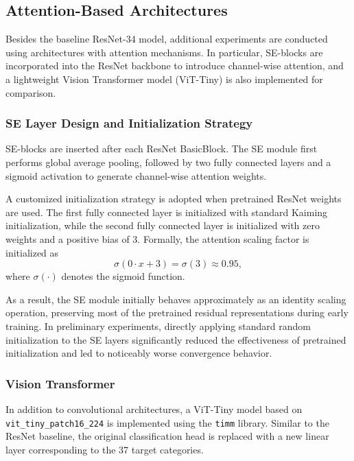 \subsection{Attention-Based Architectures}
\label{sec:attention_architectures}

Besides the baseline ResNet-34 model, additional experiments are conducted using architectures with attention mechanisms. In particular, SE-blocks are incorporated into the ResNet backbone to introduce channel-wise attention, and a lightweight Vision Transformer model (ViT-Tiny) is also implemented for comparison.

\subsubsection{SE Layer Design and Initialization Strategy}

SE-blocks are inserted after each ResNet BasicBlock. The SE module first performs global average pooling, followed by two fully connected layers and a sigmoid activation to generate channel-wise attention weights.

A customized initialization strategy is adopted when pretrained ResNet weights are used. The first fully connected layer is initialized with standard Kaiming initialization, while the second fully connected layer is initialized with zero weights and a positive bias of 3. Formally, the attention scaling factor is initialized as
\[
\sigma(0 \cdot x + 3) = \sigma(3) \approx 0.95,
\]
where $\sigma(\cdot)$ denotes the sigmoid function.

As a result, the SE module initially behaves approximately as an identity scaling operation, preserving most of the pretrained residual representations during early training. In preliminary experiments, directly applying standard random initialization to the SE layers significantly reduced the effectiveness of pretrained initialization and led to noticeably worse convergence behavior.

\subsubsection{Vision Transformer}

In addition to convolutional architectures, a ViT-Tiny model based on \texttt{vit\_tiny\_patch16\_224} is implemented using the \texttt{timm} library. Similar to the ResNet baseline, the original classification head is replaced with a new linear layer corresponding to the 37 target categories.
